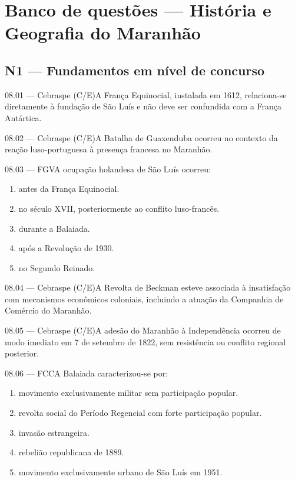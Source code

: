\section{Banco de questões — História e Geografia do Maranhão}

\subsection*{N1 — Fundamentos em nível de concurso}
\begin{questao}{ 08.01 — Cebraspe (C/E)}A França Equinocial, instalada em 1612, relaciona-se diretamente à fundação de São Luís e não deve ser confundida com a França Antártica.\end{questao}
\begin{questao}{ 08.02 — Cebraspe (C/E)}A Batalha de Guaxenduba ocorreu no contexto da reação luso-portuguesa à presença francesa no Maranhão.\end{questao}
\begin{questao}{ 08.03 — FGV}A ocupação holandesa de São Luís ocorreu:\begin{enumerate}[label=\Alph*)]\item antes da França Equinocial.\item no século XVII, posteriormente ao conflito luso-francês.\item durante a Balaiada.\item após a Revolução de 1930.\item no Segundo Reinado.\end{enumerate}\end{questao}
\begin{questao}{ 08.04 — Cebraspe (C/E)}A Revolta de Beckman esteve associada à insatisfação com mecanismos econômicos coloniais, incluindo a atuação da Companhia de Comércio do Maranhão.\end{questao}
\begin{questao}{ 08.05 — Cebraspe (C/E)}A adesão do Maranhão à Independência ocorreu de modo imediato em 7 de setembro de 1822, sem resistência ou conflito regional posterior.\end{questao}
\begin{questao}{ 08.06 — FCC}A Balaiada caracterizou-se por:\begin{enumerate}[label=\Alph*)]\item movimento exclusivamente militar sem participação popular.\item revolta social do Período Regencial com forte participação popular.\item invasão estrangeira.\item rebelião republicana de 1889.\item movimento exclusivamente urbano de São Luís em 1951.\end{enumerate}\end{questao}
